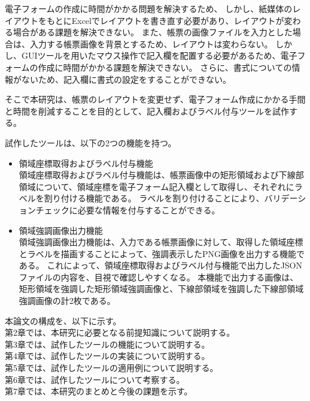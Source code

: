 電子フォームの作成に時間がかかる問題を解決するため、
しかし、紙媒体のレイアウトをもとにExcelでレイアウトを書き直す必要があり、レイアウトが変わる場合がある課題を解決できない。
また、帳票の画像ファイルを入力とした場合は、入力する帳票画像を背景とするため、レイアウトは変わらない。
しかし、GUIツールを用いたマウス操作で記入欄を配置する必要があるため、電子フォームの作成に時間がかかる課題を解決できない。
さらに、書式についての情報がないため、記入欄に書式の設定をすることができない。

そこで本研究は、帳票のレイアウトを変更せず、電子フォーム作成にかかる手間と時間を削減することを目的として、記入欄およびラベル付与ツールを試作する。



試作したツールは、以下の2つの機能を持つ。

\begin{itemize}
  \item 領域座標取得およびラベル付与機能\\
      領域座標取得およびラベル付与機能は、帳票画像中の矩形領域および下線部領域について、領域座標を電子フォーム記入欄として取得し、それぞれにラベルを割り付ける機能である。
      ラベルを割り付けることにより、バリデーションチェックに必要な情報を付与することができる。
  \item 領域強調画像出力機能\\
      領域強調画像出力機能は、入力である帳票画像に対して、取得した領域座標とラベルを描画することによって、強調表示したPNG画像を出力する機能である。
      これによって、領域座標取得およびラベル付与機能で出力したJSONファイルの内容を、目視で確認しやすくなる。
      本機能で出力する画像は、矩形領域を強調した矩形領域強調画像と、下線部領域を強調した下線部領域強調画像の計2枚である。
\end{itemize}

本論文の構成を、以下に示す。\\
第2章では、本研究に必要となる前提知識について説明する。\\
第3章では、試作したツールの機能について説明する。\\
第4章では、試作したツールの実装について説明する。\\
第5章では、試作したツールの適用例について説明する。\\
第6章では、試作したツールについて考察する。\\
第7章では、本研究のまとめと今後の課題を示す。